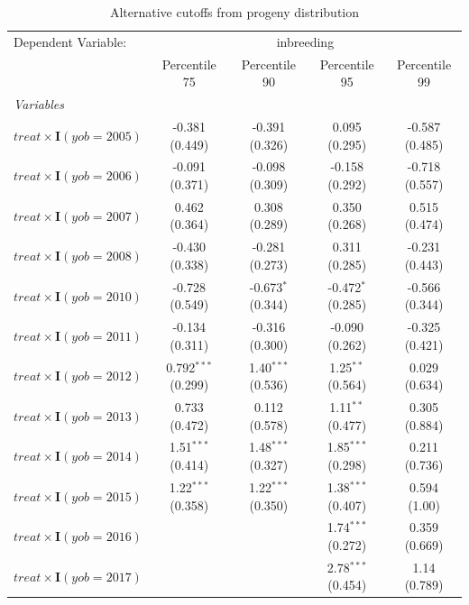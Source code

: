 
\begin{table}[htbp]
   \caption{\label{tab:table2} Alternative cutoffs from progeny distribution}
   \centering
   \begin{tabular}{lcccc}
      \tabularnewline \midrule \midrule
      Dependent Variable: & \multicolumn{4}{c}{inbreeding}\\
                                   & Percentile 75         & Percentile 90        & Percentile 95        & Percentile 99 \\   
      \midrule
      \emph{Variables}\\
      $treat \times\mathbf{I}(yob = 2005)$  & -0.381 (0.449)        & -0.391 (0.326)       & 0.095 (0.295)        & -0.587 (0.485)\\   
      $treat \times\mathbf{I}(yob = 2006)$  & -0.091 (0.371)        & -0.098 (0.309)       & -0.158 (0.292)       & -0.718 (0.557)\\   
      $treat \times\mathbf{I}(yob = 2007)$  & 0.462 (0.364)         & 0.308 (0.289)        & 0.350 (0.268)        & 0.515 (0.474)\\   
      $treat \times\mathbf{I}(yob = 2008)$  & -0.430 (0.338)        & -0.281 (0.273)       & 0.311 (0.285)        & -0.231 (0.443)\\   
      $treat \times\mathbf{I}(yob = 2010)$  & -0.728 (0.549)        & -0.673$^{*}$ (0.344) & -0.472$^{*}$ (0.285) & -0.566 (0.344)\\   
      $treat \times\mathbf{I}(yob = 2011)$  & -0.134 (0.311)        & -0.316 (0.300)       & -0.090 (0.262)       & -0.325 (0.421)\\   
      $treat \times\mathbf{I}(yob = 2012)$  & 0.792$^{***}$ (0.299) & 1.40$^{***}$ (0.536) & 1.25$^{**}$ (0.564)  & 0.029 (0.634)\\   
      $treat \times\mathbf{I}(yob = 2013)$  & 0.733 (0.472)         & 0.112 (0.578)        & 1.11$^{**}$ (0.477)  & 0.305 (0.884)\\   
      $treat \times\mathbf{I}(yob = 2014)$  & 1.51$^{***}$ (0.414)  & 1.48$^{***}$ (0.327) & 1.85$^{***}$ (0.298) & 0.211 (0.736)\\   
      $treat \times\mathbf{I}(yob = 2015)$  & 1.22$^{***}$ (0.358)  & 1.22$^{***}$ (0.350) & 1.38$^{***}$ (0.407) & 0.594 (1.00)\\   
      $treat \times\mathbf{I}(yob = 2016)$  &                       &                      & 1.74$^{***}$ (0.272) & 0.359 (0.669)\\   
      $treat \times\mathbf{I}(yob = 2017)$  &                       &                      & 2.78$^{***}$ (0.454) & 1.14 (0.789)\\      

\end{tabular}
\end{table}
